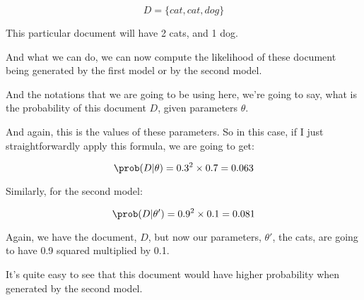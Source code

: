 \documentclass[a4paper, 12pt]{article}
\begin{document}
\begin{equation}
D=\{cat, cat, dog\}
\end{equation}

This particular document will have 2 cats, and 1 dog.

And what we can do, we can now compute the likelihood
of these document being generated by the first model
or by the second model.

And the notations that we are going to be using here, we're
going to say, what is the probability of this document \(D\), given parameters \(\theta\).

And again, this is the values of these parameters.
So in this case, if I just straightforwardly apply
this formula, we are going to get:

\begin{equation}
\prob(D|\theta)=0.3^2 \times 0.7=0.063
\end{equation}

Similarly, for the second model:

\begin{equation}
\prob(D|{\theta}')=0.9^2 \times 0.1=0.081
\end{equation}

Again, we have the document, \(D\), but now our parameters, \({\theta}'\), the
cats, are going to have 0.9 squared multiplied by 0.1.

It's quite easy to see that this document would have higher probability when
generated by the second model.
\end{document}
